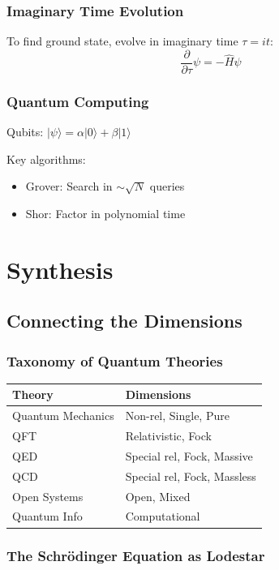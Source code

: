 \documentclass[12pt]{book}
\begin{document}
\section{Imaginary Time Evolution}

To find ground state, evolve in imaginary time $\tau = it$:
$$\frac{\partial}{\partial\tau}\psi = -\hat{H}\psi$$

\section{Quantum Computing}

Qubits: $|\psi\rangle = \alpha|0\rangle + \beta|1\rangle$

Key algorithms:
\begin{itemize}
  \item Grover: Search in $\sim\sqrt{N}$ queries
  \item Shor: Factor in polynomial time
\end{itemize}

\part{Synthesis}

\chapter{Connecting the Dimensions}

\section{Taxonomy of Quantum Theories}

\begin{tabular}{|l|l|}
\hline
\textbf{Theory} & \textbf{Dimensions} \\
\hline
Quantum Mechanics & Non-rel, Single, Pure \\
\hline
QFT & Relativistic, Fock \\
\hline
QED & Special rel, Fock, Massive \\
\hline
QCD & Special rel, Fock, Massless \\
\hline
Open Systems & Open, Mixed \\
\hline
Quantum Info & Computational \\
\hline
\end{tabular}

\section{The Schrödinger Equation as Lodestar}
\end{document}
